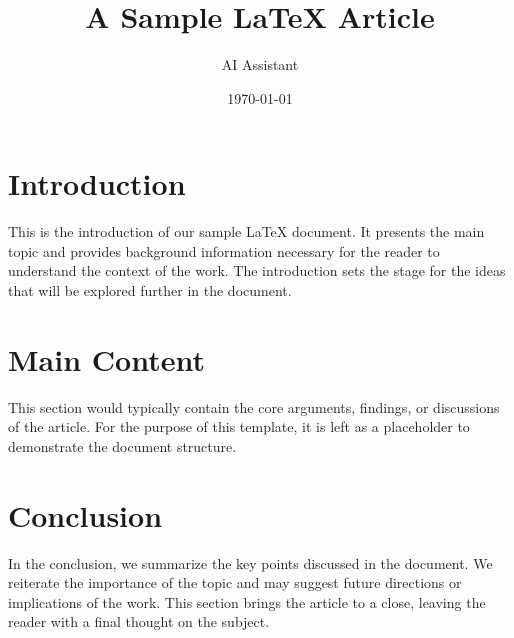 \documentclass{article}
\title{A Sample LaTeX Article}
\author{AI Assistant}
\date{\today}
\begin{document}
\maketitle

\section{Introduction}
This is the introduction of our sample LaTeX document. It presents the main topic and provides background information necessary for the reader to understand the context of the work. The introduction sets the stage for the ideas that will be explored further in the document.

\section{Main Content}
This section would typically contain the core arguments, findings, or discussions of the article. For the purpose of this template, it is left as a placeholder to demonstrate the document structure.

\section{Conclusion}
In the conclusion, we summarize the key points discussed in the document. We reiterate the importance of the topic and may suggest future directions or implications of the work. This section brings the article to a close, leaving the reader with a final thought on the subject.
\end{document}
